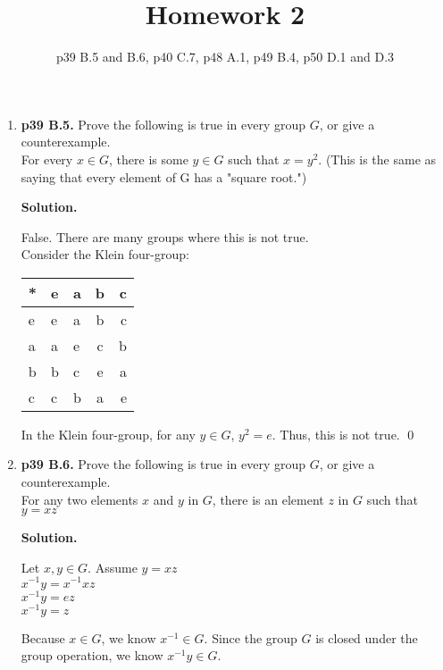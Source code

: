 \documentclass[11pt]{article}
\begin{document}
\title{Homework 2}
\date{p39 B.5 and B.6, p40 C.7, p48 A.1, p49 B.4, p50 D.1 and D.3}
\maketitle

\thispagestyle{fancy}  
\pagestyle{fancy}      

\begin{enumerate}

\item {\bfseries p39 B.5.} Prove the following is true in every group $G$, or give a counterexample. \\
  For every $x \in G$, there is some $y \in G$ such that $x = y^2$. (This is the same as saying that every element of G has a "square root.")
  
  {\bfseries Solution.}
  
  False. There are many groups where this is not true. \\
  
  Consider the Klein four-group: \\
  \begin{tabular}{l | l l c r}
	* & e & a & b & c \\
	\hline
	e & e & a & b & c \\
	a & a & e & c & b \\
	b & b & c & e & a \\
	c & c & b & a & e \\
  \end{tabular}
  
  In the Klein four-group, for any $y \in G$, $y^2 = e$. Thus, this is not true. \qed \\

 
\item {\bfseries p39 B.6.} Prove the following is true in every group $G$, or give a counterexample. \\
  For any two elements $x$ and $y$ in $G$, there is an element $z$ in $G$ such that $y = xz$
  
  {\bfseries Solution.}
  
  Let $x, y \in G$. Assume $y = xz$ \\
  $x^{-1}y = x^{-1}xz$ \\
  $x^{-1}y = ez$ \\
  $x^{-1}y = z$
  
  Because $x \in G$, we know $x^{-1} \in G$. Since the group $G$ is closed under the group operation, we know $x^{-1}y \in G$.
  

\end{enumerate}
\end{document}
